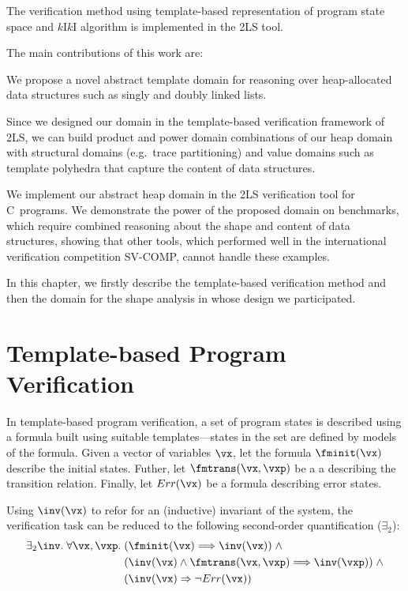 {The verification method using template-based representation of program state space and $k$I$k$I algorithm is
implemented in the 2LS tool.


The main contributions of this work are:
\begin{compactenum}
\item We propose a novel abstract template domain for reasoning over
  heap-allocated data structures such as singly and doubly linked
  lists.
\item Since we designed our domain in the template-based
  verification framework of 2LS, we can build product and power domain combinations
  of our heap domain with structural domains (e.g.\ trace partitioning) and
  value domains such as template polyhedra that capture the content of
  data structures.
\item We implement our abstract heap domain in the 2LS verification
  tool for C~programs. We demonstrate the power of the proposed domain
  on benchmarks, which require combined reasoning about
  the shape and content of data structures, showing that other tools, which
  performed well in the international verification competition SV-COMP, cannot handle these examples.
\end{compactenum}

In this chapter, we firstly describe the template-based verification method and then the domain for the shape
analysis in whose design we participated.

\section{Template-based Program Verification}

In template-based program verification, 
a set of program states is described using
a formula built using suitable templates---states in the set are defined by models of the formula. Given a
vector of variables $\vx$, let the formula $\fminit(\vx)$ describe
the initial states. Futher, let $\fmtrans(\vx, \vxp)$ be a a describing the transition relation.
Finally, let $Err(\vx)$ be a formula describing error states.

Using $\inv(\vx)$ to refor for an (inductive) invariant of the system,
the verification task can be reduced to the following second-order
quantification ($\exists_2$):
\begin{equation}\label{eq:2ls}
\begin{split}
\exists_2 \inv . \; \forall \vx, \vxp . \; 
& (\fminit(\vx) \Longrightarrow \inv(\vx)) \; \wedge \\ 
& (\inv(\vx) \wedge \fmtrans(\vx,\vxp) \Longrightarrow \inv(\vxp)) \; \wedge \\
& (\inv(\vx) \Rightarrow \neg Err(\vx))
\end{split}
\end{equation}

}
